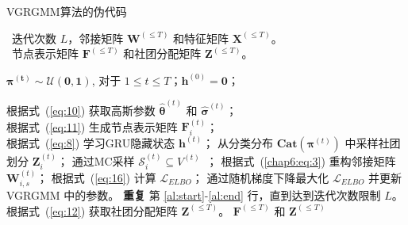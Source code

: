 \begin{algorithm}
	\caption{VGRGMM算法的伪代码} %
	
	\algorithmicrequire ~迭代次数 $L$，邻接矩阵 $\mathbf{W}^{(\le T)}$ 和特征矩阵 $\mathbf{X}^{(\le T)}$。\\
	\algorithmicensure ~节点表示矩阵 $\mathbf{F}^{(\le T)}$ 和社团分配矩阵 $\mathbf{Z}^{(\le T)}$。 \\
	\begin{algorithmic}[1]
		 $\bm{\pi^{(t)}} \sim \bm{\mathcal{U}(0,1)}$, 对于 $1 \le t \le T$；$ \mathbf{h}^{(0)}=\mathbf{0}$；
		 \label{al:start}
		
		\STATE 根据式~(\ref{eq:10}) 获取高斯参数 $\hat{\mathbf{\theta}}^{(t)}$ 和 $\hat{\mathbf{\sigma}}^{(t)}$； \label{al:enstart} \\
		\STATE 根据式~(\ref{eq:11}) 生成节点表示矩阵 $\mathbf{F}_i^{(t)}$； \label{al:enend} \\
		\STATE 根据式~(\ref{eq:8}) 学习GRU隐藏状态 $\mathbf{h}^{(t)}$； \label{al:ev}
		   \label{al:destart}
		\STATE 从分类分布 $\boldsymbol{Cat}(\bm{\pi}^{(t)})$ 中采样社团划分 $\mathbf{Z}_i^{(t)}$；
		\STATE 通过MC采样 $\mathcal{S}_i^{(t)} \subseteq V^{(t)}$~\cite{kingma2013auto}；
		\STATE 根据式~(\ref{chap6:eq:3}) 重构邻接矩阵 $\mathbf{W}_{i,s}^{(t)}$；
		\ENDFOR
		\ENDFOR 
		\ENDFOR \label{al:deend}
		\STATE 根据式~(\ref{eq:16}) 计算 $\mathcal{L}_{ELBO}$； \label{al:trstart}
		\STATE 通过随机梯度下降最大化 $\mathcal{L}_{ELBO}$ 并更新 VGRGMM 中的参数。\label{al:end} \label{al:trend}
		\STATE \textbf{重复} 第 \ref{al:start}-\ref{al:end} 行，直到达到迭代次数限制 $L$。
		\STATE 根据式~(\ref{eq:12}) 获取社团分配矩阵 $\mathbf{Z}^{(\le T)}$。 \label{al:ass}
		\RETURN $\mathbf{F}^{(\le T)}$ 和 $\mathbf{Z}^{(\le T)}$
		
	\end{algorithmic}
	\label{algorithm:chap6}
\end{algorithm}

